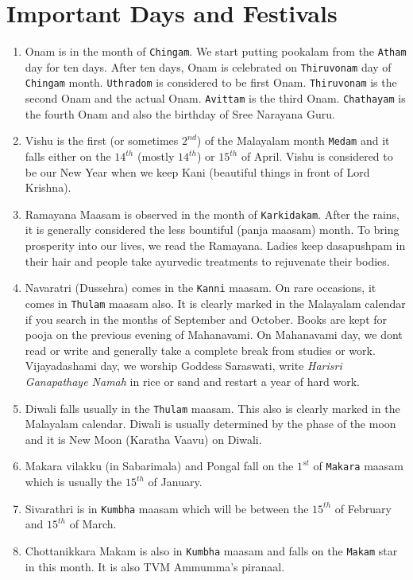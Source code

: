 \documentclass[10pt,twoside]{article}
\begin{document}
\section{Important Days and Festivals}
\begin{enumerate}
\item Onam is in the month of \verb|Chingam|. We start putting pookalam from the \verb|Atham| day for ten days. After ten days, Onam is celebrated on \verb|Thiruvonam| day of \verb|Chingam| month. \verb|Uthradom| is considered to be first Onam. \verb|Thiruvonam| is the second Onam and the actual Onam. \verb|Avittam| is the third Onam. \verb|Chathayam| is the fourth Onam and also the birthday of Sree Narayana Guru.
\item Vishu is the first (or sometimes $2^{nd}$) of the Malayalam month \verb|Medam| and it falls either on the $14^{th}$ (mostly $14^{th}$) or $15^{th}$ of April. Vishu is considered to be our New Year when we keep Kani (beautiful things in front of Lord Krishna).
\item Ramayana Maasam is observed in the month of \verb|Karkidakam|. After the rains, it is generally considered the less bountiful (panja maasam) month. To bring prosperity into our lives, we read the Ramayana. Ladies keep dasapushpam in their hair and people take ayurvedic treatments to rejuvenate their bodies.
\item Navaratri (Dussehra) comes in the \verb|Kanni| maasam. On rare occasions, it comes in \verb|Thulam| maasam also. It is clearly marked in the Malayalam calendar if you search in the months of September and October. Books are kept for pooja on the previous evening of Mahanavami. On Mahanavami day,  we dont read or write and generally take a complete break from studies or work. Vijayadashami day, we worship Goddess Saraswati, write \emph{Harisri Ganapathaye Namah} in rice or sand and restart a year of hard work.
\item Diwali falls usually in the \verb|Thulam| maasam. This also is clearly marked in the Malayalam calendar. Diwali is usually determined by the phase of the moon and it is New Moon (Karatha Vaavu) on Diwali.
\item Makara vilakku (in Sabarimala) and Pongal fall on the $1^{st}$ of \verb|Makara| maasam which is usually the $15^{th}$ of January.
\item Sivarathri is in \verb|Kumbha| maasam which will be between the $15^{th}$ of February and $15^{th}$ of March.
\item Chottanikkara Makam is also in \verb|Kumbha| maasam and falls on the \verb|Makam| star in this month. It is also TVM Ammumma's piranaal.

\end{enumerate}
\end{document}
